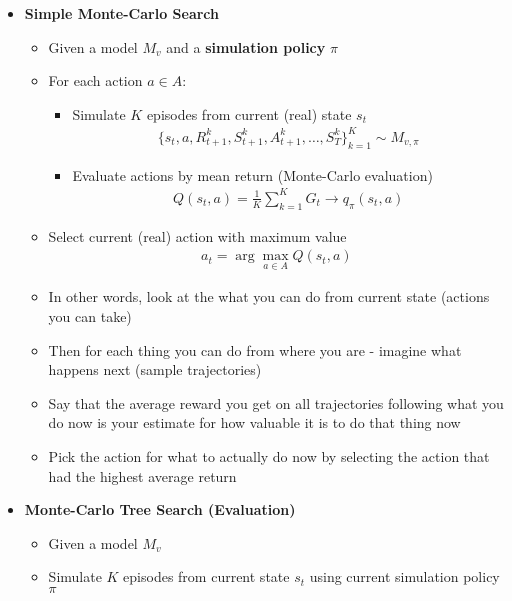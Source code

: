 \documentclass[12pt]{article}
\begin{document}
\begin{itemize}
\begin{itemize}
\begin{itemize}
      \end{itemize}
    \end{itemize}
    \item \textbf{Simple Monte-Carlo Search}
    \begin{itemize}
      \item Given a model $M_v$ and a \textbf{simulation policy} $\pi$
      \item For each action $a \in A$:
      \begin{itemize}
        \item Simulate $K$ episodes from current (real) state $s_t$
        \begin{gather*}
          \{s_t, a, R^k_{t+1}, S^k_{t+1}, A^k_{t+1}, \dots, S^k_T\}^K_{k=1} \sim M_{v, \pi}
        \end{gather*}
        \item Evaluate actions by mean return (Monte-Carlo evaluation)
        \begin{gather*}
          Q(s_t, a) = \frac{1}{K} \sum_{k=1}^{K} G_t \rightarrow q_\pi(s_t,a) 
        \end{gather*}
      \end{itemize}
      \item Select current (real) action with maximum value
      \begin{gather*}
        a_t = \arg\max\limits_{a \in A} Q(s_t, a)
      \end{gather*}
      \item In other words, look at the what you can do from current state (actions you can take)
      \item Then for each thing you can do from where you are - imagine what happens next (sample trajectories) 
      \item Say that the average reward you get on all trajectories following what you do now is your estimate for how valuable it is
      to do that thing now
      \item Pick the action for what to actually do now by selecting the action that had the highest average return
    \end{itemize}
    \item \textbf{Monte-Carlo Tree Search (Evaluation)}
    \begin{itemize}
      \item Given a model $M_v$
      \item Simulate $K$ episodes from current state $s_t$ using current
      simulation policy $\pi$
      \begin{gather*}

\end{gather*}
\end{itemize}
\end{itemize}
\end{document}
